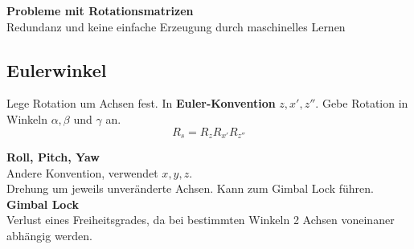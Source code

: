 \textbf{Probleme mit Rotationsmatrizen}\\
Redundanz und keine einfache Erzeugung durch maschinelles Lernen

\subsection{Eulerwinkel}
Lege Rotation um Achsen fest. In \textbf{Euler-Konvention} \(z, x', z''\).
Gebe Rotation in Winkeln \(\alpha, \beta\) und \(\gamma\) an.
\[ R_s = R_z R_{x'} R_{z''}\]

\textbf{Roll, Pitch, Yaw}\\
Andere Konvention, verwendet \(x, y, z\).\\
Drehung um jeweils unveränderte Achsen.
Kann zum Gimbal Lock führen.\\

\textbf{Gimbal Lock}\\
Verlust eines Freiheitsgrades, da bei bestimmten Winkeln 2 Achsen voneinaner abhängig werden.